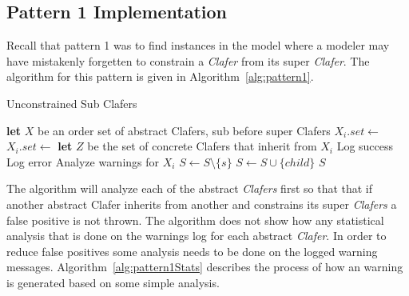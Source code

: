 \documentclass[10pt,oneside]{IEEEtran}
\begin{document}
\subsection{Pattern 1 Implementation}
Recall that pattern 1 was to find instances in the model where a modeler may have mistakenly forgetten to constrain a \textit{Clafer} from its super \textit{Clafer}. The algorithm for this pattern is given in Algorithm~\ref{alg:pattern1}.

\begin{algorithm}[H]
\caption{Unconstrained Sub Clafers}\label{alg:pattern1}
\begin{algorithmic}[1]
  \State \textbf{let} $X$ be an order set of abstract Clafers, sub before super Clafers
      \State $X_i.set \gets$ 
    \Else
      \State $X_i.set \gets$ 
    \EndIf
  \EndFor
    \State \textbf{let} $Z$ be the set of concrete Clafers that inherit from $X_i$
          \State Log success
        \Else
          \State Log error
        \EndIf
      \EndFor
      \State Analyze warnings for $X_i$
    \EndFor
  \EndFor
\EndProcedure
{}
      \State $S \gets S \setminus \{s\}$
    \EndIf
   \EndFor
      \State $S \gets S \cup \{child\}$
    \EndIf
   \EndFor
   \State \Return $S$
\EndProcedure
\end{algorithmic}
\end{algorithm}

The algorithm will analyze each of the abstract \textit{Clafers} first so that that if another abstract Clafer inherits from another and constrains its super \textit{Clafers} a false positive is not thrown. The algorithm does not show how any statistical analysis that is done on the warnings log for each abstract \textit{Clafer}. In order to reduce false positives some analysis needs to be done on the logged warning messages. Algorithm~\ref{alg:pattern1Stats} describes the process of how an warning is generated based on some simple analysis.
\end{document}
